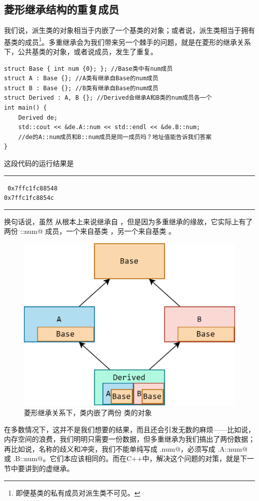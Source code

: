 \subsection*{菱形继承结构的重复成员}
我们说，派生类的对象相当于内嵌了一个基类的对象；或者说，派生类相当于拥有基类的成员\footnote{即便基类的私有成员对派生类不可见。}。多重继承会为我们带来另一个棘手的问题，就是在菱形的继承关系下，公共基类的对象，或者说成员，发生了重复。\par
\begin{lstlisting}
struct Base { int num {0}; }; //Base类中有num成员
struct A : Base {}; //A类有继承自Base的num成员
struct B : Base {}; //B类有继承自Base的num成员
struct Derived : A, B {}; //Derived会继承A和B类的num成员各一个
int main() {
    Derived de;
    std::cout << &de.A::num << std::endl << &de.B::num;
    //de的A::num成员和B::num成员是同一成员吗？地址值能告诉我们答案
}
\end{lstlisting}
这段代码的运行结果是\\\noindent\rule{\linewidth}{.2pt}\texttt{
0x7ffc1fc88548\\
0x7ffc1fc8854c
}\\\noindent\rule{\linewidth}{.2pt}
换句话说，虽然 \lstinline@Derived@ 从根本上来说继承自 \lstinline@Base@，但是因为多重继承的缘故，它实际上有了两份 \lstinline@Base::num@ 成员，一个来自基类 \lstinline@A@，另一个来自基类 \lstinline@B@。\par
\begin{figure}[htbp]
    \centering
    \includegraphics[width=.5\textwidth]{../images/generalized_parts/10_diamond_inheritance_300.png}
    \caption{菱形继承关系下，\lstinline@Derived@ 类内嵌了两份 \lstinline@Base@ 类的对象}
\end{figure}
在多数情况下，这并不是我们想要的结果，而且还会引发无数的麻烦——比如说，内存空间的浪费，我们明明只需要一份数据，但多重继承为我们搞出了两份数据；再比如说，名称的歧义和冲突，我们不能单纯写成 \lstinline@d.num@，必须写成 \lstinline@d.A::num@ 或 \lstinline@d.B::num@。它们本应该相同的。而在C++中，解决这个问题的对策，就是下一节中要讲到的虚继承。\par
